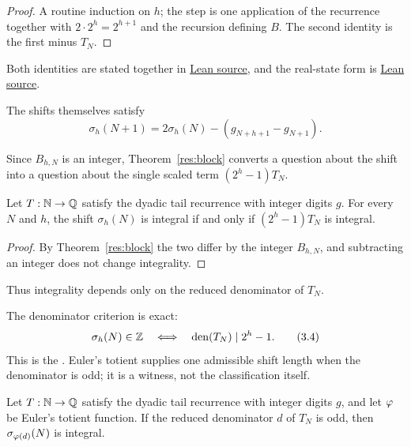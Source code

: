 \documentclass[11pt]{article}
\begin{document}
\begin{proof}
A routine induction on $h$; the step is one application of the recurrence together with
$2\cdot2^{h}=2^{h+1}$ and the recursion defining $B$.  The second identity is
the first minus $T_N$.
\end{proof}

\noindent Both identities are stated together in
\href{https://github.com/wcook04/plectis-erdos/blob/f36a98bf3d3e6f65f1074e3b800e3293d5b8a51a/ErdosProblems/Erdos251/PaperCoreR7.lean#L68}{Lean source}, and the real-state form is
\href{https://github.com/wcook04/plectis-erdos/blob/f36a98bf3d3e6f65f1074e3b800e3293d5b8a51a/ErdosProblems/Erdos251/PaperCoreR7.lean#L76}{Lean source}.

The shifts themselves satisfy
\[
 \sigma_h(N+1)=2\sigma_h(N)-(g_{N+h+1}-g_{N+1}).
\]

Since $B_{h,N}$ is an integer, Theorem~\ref{res:block} converts a question about
the shift into a question about the single scaled term $(2^{h}-1)T_N$.

\begin{theorem}\label{res:shiftiff}
Let $T:\mathbb{N}\to\mathbb{Q}$ satisfy the dyadic tail recurrence with integer digits $g$.
For every $N$ and $h$, the shift $\sigma_h(N)$ is integral if and only if
$(2^{h}-1)T_N$ is integral.
\end{theorem}

\begin{proof}
By Theorem~\ref{res:block} the two differ by the integer $B_{h,N}$, and
subtracting an integer does not change integrality.
\end{proof}

Thus integrality depends only on the reduced denominator of $T_N$.

The denominator criterion is exact:
\[
  \sigma_h(N)\in\mathbb{Z}
  \quad\Longleftrightarrow\quad
  \operatorname{den}(T_N)\mid 2^h-1.
\tag{3.4}\label{eq:shift-denominator}
\]
This is the
.  Euler's totient supplies one admissible shift length when
the denominator is odd; it is a witness, not the classification itself.

\begin{theorem}\label{res:totient}
Let $T:\mathbb{N}\to\mathbb{Q}$ satisfy the dyadic tail recurrence with integer digits $g$, and
let $\varphi$ be Euler's totient function.  If the reduced denominator $d$ of
$T_N$ is odd, then $\sigma_{\varphi(d)}(N)$ is integral.
\end{theorem}
\end{document}

